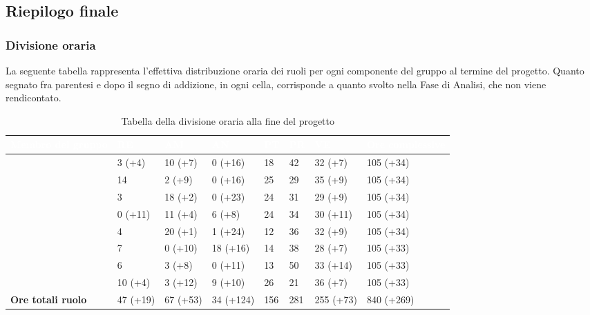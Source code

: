 \subsection{Riepilogo finale}

\subsubsection{Divisione oraria}
La seguente tabella rappresenta l'effettiva distribuzione oraria dei ruoli per ogni componente del gruppo al termine del progetto. Quanto segnato fra parentesi e dopo il segno di addizione, in ogni cella, corrisponde a quanto svolto nella Fase di Analisi, che non viene rendicontato.
{
\renewcommand{\arraystretch}{2}
\begin{longtable}[h!] { C{3cm} C{1.4cm} C{1.4cm} C{1.6cm} C{0.9cm} C{0.9cm} C{1.6cm} C{2.3cm}}
\caption{Tabella della divisione oraria alla fine del progetto}\\

\textcolor{white}{\textbf{Membro del gruppo}} & 
\textcolor{white}{\textbf{RE}} & 
\textcolor{white}{\textbf{AM}} & 
\textcolor{white}{\textbf{AN}} & 
\textcolor{white}{\textbf{PT}} & 
\textcolor{white}{\textbf{PR}} & 
\textcolor{white}{\textbf{VE}} & 
\textcolor{white}{\textbf{Ore complessive}}\\	
\endhead
        
\MC{}                     &  3 (+4)  & 10 (+7)  &  0 (+16)  &  18 &  42 &  32 (+7)  & 105 (+34)  \\
\LD{}                     & 14       &  2 (+9)  &  0 (+16)  &  25 &  29 &  35 (+9)  & 105 (+34)  \\
\CE{}                     &  3       & 18 (+2)  &  0 (+23)  &  24 &  31 &  29 (+9)  & 105 (+34)  \\
\SE{}                     &  0 (+11) & 11 (+4)  &  6 (+8)   &  24 &  34 &  30 (+11) & 105 (+34)  \\
\PF{}                     &  4       & 20 (+1)  &  1 (+24)  &  12 &  36 &  32 (+9)  & 105 (+34)  \\
\DF{}                     &  7       &  0 (+10) & 18 (+16)  &  14 &  38 &  28 (+7)  & 105 (+33)  \\
\BR{}                     &  6       &  3 (+8)  &  0 (+11)  &  13 &  50 &  33 (+14) & 105 (+33)  \\
\AT{}                     & 10 (+4)  &  3 (+12) &  9 (+10)  &  26 &  21 &  36 (+7)  & 105 (+33)  \\
\textbf{Ore totali ruolo} & 47 (+19) & 67 (+53) & 34 (+124) & 156 & 281 & 255 (+73) & 840 (+269) \\
		
\end{longtable}
}

